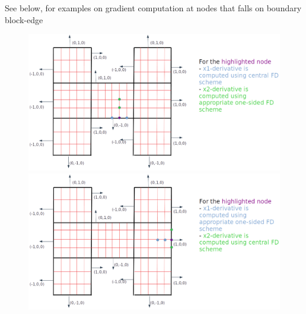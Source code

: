 \documentclass[a4paper,12pt]{article}
\begin{document}
See below, for examples on gradient computation at nodes that falls on boundary block-edge

\begin{figure}[H]
	\centering
	\includegraphics[scale=0.23]{figures/EdgeBdryNrml_Grad1.png}
	\includegraphics[scale=0.23]{figures/EdgeBdryNrml_Grad2.png}
\end{figure}
\end{document}
